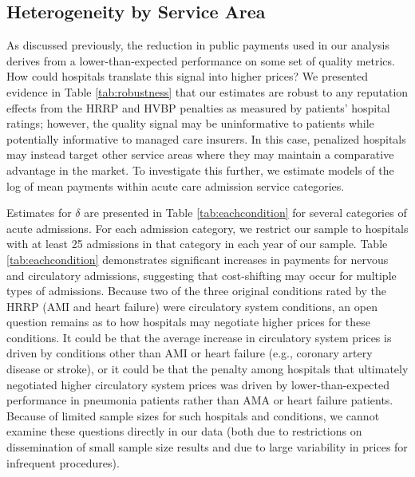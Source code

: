 \documentclass[12pt]{article}
\begin{document}
\subsection{Heterogeneity by Service Area}
As discussed previously, the reduction in public payments used in our analysis derives from a lower-than-expected performance on some set of quality metrics. How could hospitals translate this signal into higher prices? We presented evidence in Table \ref{tab:robustness} that our estimates are robust to any reputation effects from the HRRP and HVBP penalties as measured by patients' hospital ratings; however, the quality signal may be uninformative to patients while potentially informative to managed care insurers. In this case, penalized hospitals may instead target other service areas where they may maintain a comparative advantage in the market. To investigate this further, we estimate models of the log of mean payments within acute care admission service categories.

Estimates for $\delta$ are presented in Table \ref{tab:eachcondition} for several categories of acute admissions. For each admission category, we restrict our sample to hospitals with at least 25 admissions in that category in each year of our sample. Table \ref{tab:eachcondition} demonstrates significant increases in payments for nervous and circulatory admissions, suggesting that cost-shifting may occur for multiple types of admissions. Because two of the three original conditions rated by the HRRP (AMI and heart failure) were circulatory system conditions, an open question remains as to how hospitals may negotiate higher prices for these conditions. It could be that the average increase in circulatory system prices is driven by conditions other than AMI or heart failure (e.g., coronary artery disease or stroke), or it could be that the penalty among hospitals that ultimately negotiated higher circulatory system prices was driven by lower-than-expected performance in pneumonia patients rather than AMA or heart failure patients. Because of limited sample sizes for such hospitals and conditions, we cannot examine these questions directly in our data (both due to restrictions on dissemination of small sample size results and due to large variability in prices for infrequent procedures).
\end{document}
